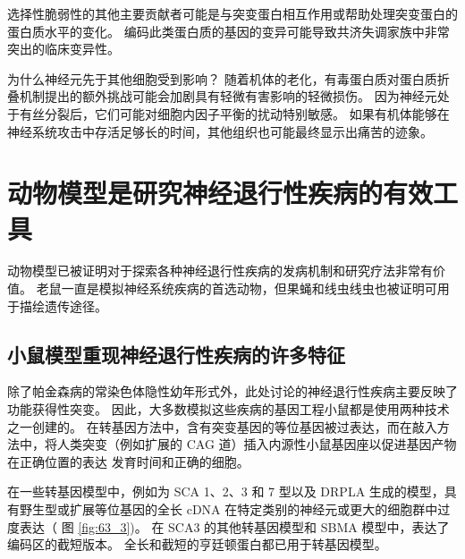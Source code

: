 选择性脆弱性的其他主要贡献者可能是与突变蛋白相互作用或帮助处理突变蛋白的蛋白质水平的变化。 编码此类蛋白质的基因的变异可能导致共济失调家族中非常突出的临床变异性。

为什么神经元先于其他细胞受到影响？ 随着机体的老化，有毒蛋白质对蛋白质折叠机制提出的额外挑战可能会加剧具有轻微有害影响的轻微损伤。 因为神经元处于有丝分裂后，它们可能对细胞内因子平衡的扰动特别敏感。 如果有机体能够在神经系统攻击中存活足够长的时间，其他组织也可能最终显示出痛苦的迹象。

\section{动物模型是研究神经退行性疾病的有效工具}
动物模型已被证明对于探索各种神经退行性疾病的发病机制和研究疗法非常有价值。 老鼠一直是模拟神经系统疾病的首选动物，但果蝇和线虫线虫也被证明可用于描绘遗传途径。

\subsection{小鼠模型重现神经退行性疾病的许多特征}
除了帕金森病的常染色体隐性幼年形式外，此处讨论的神经退行性疾病主要反映了功能获得性突变。 因此，大多数模拟这些疾病的基因工程小鼠都是使用两种技术之一创建的。 在转基因方法中，含有突变基因的等位基因被过表达，而在敲入方法中，将人类突变（例如扩展的 CAG 道）插入内源性小鼠基因座以促进基因产物在正确位置的表达 发育时间和正确的细胞。

在一些转基因模型中，例如为 SCA 1、2、3 和 7 型以及 DRPLA 生成的模型，具有野生型或扩展等位基因的全长 cDNA 在特定类别的神经元或更大的细胞群中过度表达（ 图 \ref{fig:63_3})。 在 SCA3 的其他转基因模型和 SBMA 模型中，表达了编码区的截短版本。 全长和截短的亨廷顿蛋白都已用于转基因模型。

